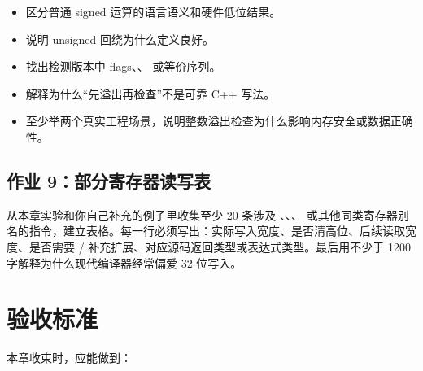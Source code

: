 \begin{exercisebox}
\begin{itemize}
  \item 区分普通 signed 运算的语言语义和硬件低位结果。
  \item 说明 unsigned 回绕为什么定义良好。
  \item 找出检测版本中 flags、、 或等价序列。
  \item 解释为什么“先溢出再检查”不是可靠 C++ 写法。
  \item 至少举两个真实工程场景，说明整数溢出检查为什么影响内存安全或数据正确性。
\end{itemize}

\subsection*{作业 9：部分寄存器读写表}

从本章实验和你自己补充的例子里收集至少 20 条涉及 、、、 或其他同类寄存器别名的指令，建立表格。每一行必须写出：实际写入宽度、是否清高位、后续读取宽度、是否需要 / 补充扩展、对应源码返回类型或表达式类型。最后用不少于 1200 字解释为什么现代编译器经常偏爱 32 位写入。
\end{exercisebox}

\section{验收标准}

本章收束时，应能做到：


